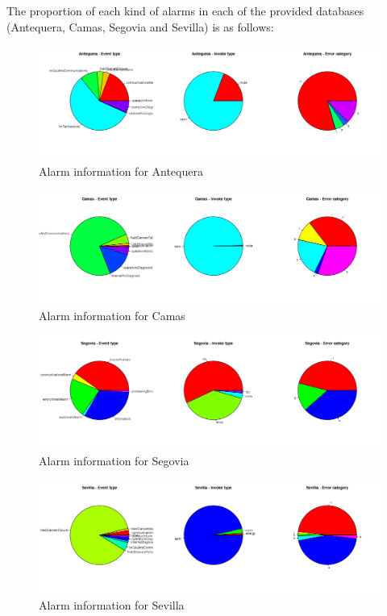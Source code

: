 \documentclass[a4paper,10pt]{book}
\begin{document}
The proportion of each kind of alarms in each of the provided databases (Antequera, Camas, Segovia and Sevilla) is as follows:
\begin{figure}[ht!]
 \centering
 \includegraphics[width=\textwidth]{./img/antequera_graph.png}
 \caption{Alarm information for Antequera}
 \label{fig:anteq}
\end{figure}
\begin{figure}[ht!]
 \centering
 \includegraphics[width=\textwidth]{./img/camas_graph.png}
 \caption{Alarm information for Camas}
 \label{fig:camas}
\end{figure}
\begin{figure}[ht!]
 \centering
 \includegraphics[width=\textwidth]{./img/segovia_graph.png}
 \caption{Alarm information for Segovia}
 \label{fig:segovia}
\end{figure}
\begin{figure}[ht!]
 \centering
 \includegraphics[width=\textwidth]{./img/sevilla_graph.png}
 \caption{Alarm information for Sevilla}
 \label{fig:sevilla}
\end{figure}
\end{document}

